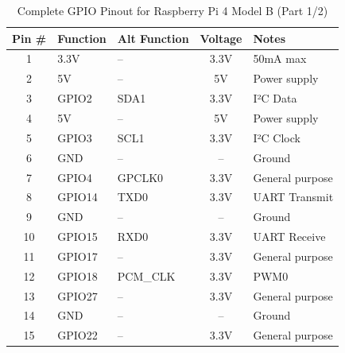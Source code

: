 \begin{table}[h!]
	\centering
	\caption{Complete GPIO Pinout for Raspberry Pi 4 Model B (Part 1/2)}
	\label{table:rpi4_gpio_part1}
	\begin{tabular}{|c|l|l|c|l|}
		\hline
		\textbf{Pin \#} & \textbf{Function} & \textbf{Alt Function} & \textbf{Voltage} & \textbf{Notes} \\ \hline
		1 & 3.3V & -- & 3.3V & 50mA max \\ \hline
		2 & 5V & -- & 5V & Power supply \\ \hline
		3 & GPIO2 & SDA1 & 3.3V & I²C Data \\ \hline
		4 & 5V & -- & 5V & Power supply \\ \hline
		5 & GPIO3 & SCL1 & 3.3V & I²C Clock \\ \hline
		6 & GND & -- & -- & Ground \\ \hline
		7 & GPIO4 & GPCLK0 & 3.3V & General purpose \\ \hline
		8 & GPIO14 & TXD0 & 3.3V & UART Transmit \\ \hline
		9 & GND & -- & -- & Ground \\ \hline
		10 & GPIO15 & RXD0 & 3.3V & UART Receive \\ \hline
		11 & GPIO17 & -- & 3.3V & General purpose \\ \hline
		12 & GPIO18 & PCM\_CLK & 3.3V & PWM0 \\ \hline
		13 & GPIO27 & -- & 3.3V & General purpose \\ \hline
		14 & GND & -- & -- & Ground \\ \hline
		15 & GPIO22 & -- & 3.3V & General purpose \\ \hline

	\end{tabular}
\end{table}

